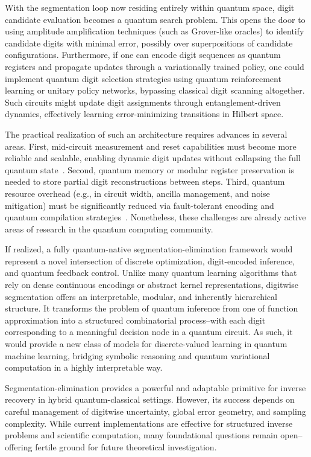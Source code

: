 \documentclass[aps,twocolumn,superscriptaddress,nofootinbib]{revtex4}
\begin{document}
With the segmentation loop now residing entirely within quantum space, digit candidate evaluation becomes a quantum search problem. This opens the door to using amplitude amplification techniques (such as Grover-like oracles) to identify candidate digits with minimal error, possibly over superpositions of candidate configurations. Furthermore, if one can encode digit sequences as quantum registers and propagate updates through a variationally trained policy, one could implement quantum digit selection strategies using quantum reinforcement learning or unitary policy networks, bypassing classical digit scanning altogether. Such circuits might update digit assignments through entanglement-driven dynamics, effectively learning error-minimizing transitions in Hilbert space.

The practical realization of such an architecture requires advances in several areas. First, mid-circuit measurement and reset capabilities must become more reliable and scalable, enabling dynamic digit updates without collapsing the full quantum state~\cite{murali2020software}. Second, quantum memory or modular register preservation is needed to store partial digit reconstructions between steps. Third, quantum resource overhead (e.g., in circuit width, ancilla management, and noise mitigation) must be significantly reduced via fault-tolerant encoding and quantum compilation strategies~\cite{roberts2020memory}. Nonetheless, these challenges are already active areas of research in the quantum computing community.

If realized, a fully quantum-native segmentation-elimination framework would represent a novel intersection of discrete optimization, digit-encoded inference, and quantum feedback control. Unlike many quantum learning algorithms that rely on dense continuous encodings or abstract kernel representations, digitwise segmentation offers an interpretable, modular, and inherently hierarchical structure. It transforms the problem of quantum inference from one of function approximation into a structured combinatorial process--with each digit corresponding to a meaningful decision node in a quantum circuit. As such, it would provide a new class of models for discrete-valued learning in quantum machine learning, bridging symbolic reasoning and quantum variational computation in a highly interpretable way.

Segmentation-elimination provides a powerful and adaptable primitive for inverse recovery in hybrid quantum-classical settings. However, its success depends on careful management of digitwise uncertainty, global error geometry, and sampling complexity. While current implementations are effective for structured inverse problems and scientific computation, many foundational questions remain open--offering fertile ground for future theoretical investigation.
\end{document}
